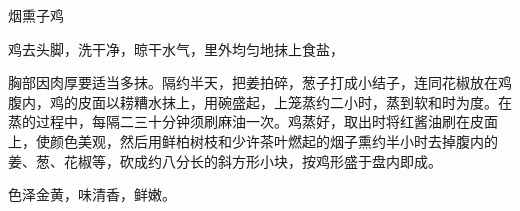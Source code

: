 \begin{recipe}{烟熏子鸡}

\ingredients


\cooking

鸡去头脚，洗干净，晾干水气，里外均匀地抹上食盐，

胸部因肉厚要适当多抹。隔约半天，把姜拍碎，葱子打成小结子，连同花椒放在鸡腹内，鸡的皮面以耢糟水抹上，用碗盛起，上笼蒸约二小时，蒸到软和时为度。在蒸的过程中，每隔二三十分钟须刷麻油一次。鸡蒸好，取出时将红酱油刷在皮面上，使颜色美观，然后用鲜柏树枝和少许茶叶燃起的烟子熏约半小时去掉腹内的姜、葱、花椒等，砍成约八分长的斜方形小块，按鸡形盛于盘内即成。

\notes

色泽金黄，味清香，鲜嫩。

\end{recipe}

